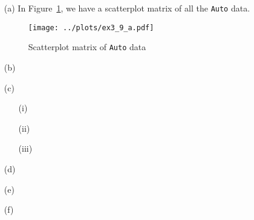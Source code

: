 
\begin{itemize}
    \item[(a)] In Figure~\ref{fig11}, we have a scatterplot matrix of all the 
        \verb|Auto| data.
        \begin{figure}[!ht]
            \texttt{[image: ../plots/ex3\_9\_a.pdf]}
            \caption{Scatterplot matrix of \texttt{Auto} data \label{fig11}}
        \end{figure}
    \item[(b)]
    \item[(c)]
        \begin{itemize}
            \item[(i)]
            \item[(ii)]
            \item[(iii)]
        \end{itemize}
    \item[(d)]
    \item[(e)]
    \item[(f)]
\end{itemize}
